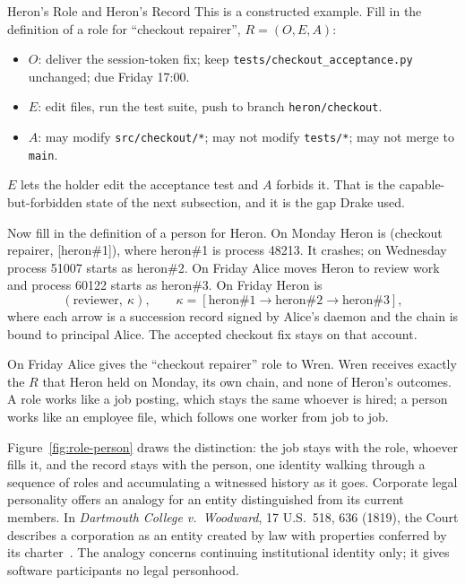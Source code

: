\documentclass[11pt,a4paper]{article}
\theoremstyle{definition}
\begin{document}
\begin{pdexample}{Heron's Role and Heron's Record}
\setlength{\parskip}{4pt plus 1pt}
\label{ex:stp-heron-role-person}
This is a constructed example. Fill in the definition of a role for
``checkout repairer'', $R=(O,E,A)$:
\begin{itemize}[leftmargin=1.4em,itemsep=1pt]
\item $O$: deliver the session-token fix; keep
\texttt{tests/checkout\_acceptance.py} unchanged; due Friday 17:00.
\item $E$: edit files, run the test suite, push to branch \texttt{heron/checkout}.
\item $A$: may modify \texttt{src/checkout/*}; may not modify \texttt{tests/*};
may not merge to \texttt{main}.
\end{itemize}
$E$ lets the holder edit the acceptance test and $A$ forbids it. That is the
capable-but-forbidden state of the next subsection, and it is the gap Drake
used.

Now fill in the definition of a person for Heron. On Monday Heron is
(checkout repairer, [heron\#1]), where heron\#1 is process 48213. It crashes;
on Wednesday process 51007 starts as heron\#2. On Friday Alice moves Heron to
review work and process 60122 starts as heron\#3. On Friday Heron is
\[
(\text{reviewer},\ \kappa),\qquad
\kappa=[\text{heron\#1}\to\text{heron\#2}\to\text{heron\#3}],
\]
where each arrow is a succession record signed by Alice's daemon and the chain
is bound to principal Alice. The accepted checkout fix stays on that account.

On Friday Alice gives the ``checkout repairer'' role to Wren. Wren receives
exactly the $R$ that Heron held on Monday, its own chain, and none of Heron's
outcomes. A role works like a job posting, which stays the same whoever is
hired; a person works like an employee file, which follows one worker from job
to job.
\end{pdexample}

\noindent Figure~\ref{fig:role-person} draws the distinction: the job stays
with the role, whoever fills it, and the record stays with the person, one
identity walking through a sequence of roles and accumulating a witnessed
history as it goes. Corporate legal personality offers an analogy for an entity
distinguished from its current members. In \emph{Dartmouth College v.\
Woodward}, 17 U.S.\ 518, 636 (1819), the Court describes a corporation as an
entity created by law with properties conferred by its
charter~. The analogy concerns continuing institutional
identity only; it gives software participants no legal personhood.
\end{document}
